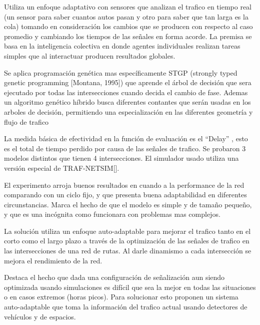 \begin{itemize}
	\begin{item}
Utiliza un enfoque adaptativo con sensores que analizan el trafico en tiempo real (un sensor para saber cuantos autos pasan y otro para saber que tan larga es la cola) tomando en consideración los cambios que se producen con respecto al caso promedio y cambiando los tiempos de las señales en forma acorde.
La premisa se basa en la inteligencia colectiva en donde agentes individuales realizan tareas simples que al interactuar producen resultados globales.

Se aplica programación genética mas específicamente STGP (strongly typed genetic programming [Montana, 1995]) que aprende el árbol de decisión que sera ejecutado por todas las intersecciones cuando decida el cambio de fase. Ademas un algoritmo genético híbrido busca diferentes contantes que serán usadas en los arboles de decisión, permitiendo una especialización en las diferentes geometría y flujo de trafico

La medida básica de efectividad en la función de evaluación es el “Delay” , esto es el total de tiempo perdido por causa de las señales de trafico. Se probaron 3 modelos distintos que tienen 4 intersecciones.
El simulador usado utiliza una versión especial de TRAF-NETSIM[].

El experimento arroja buenos resultados en cuando a la performance de la red comparando con un ciclo fijo, y que presenta buena adaptabilidad en diferentes circunstancias. Marca el hecho de que el modelo es simple y de tamaño pequeño, y que es una incógnita como funcionara con problemas mas complejos.
	
	\end{item}	


	\begin{item}
		\bibentry{Vogel2000}

La solución utiliza un enfoque auto-adaptable para mejorar el trafico tanto en el corto como el largo plazo a través de la optimización de las señales de trafico en las intersecciones de una red de rutas. Al darle dinamismo a cada intersección se mejora el rendimiento de la red.

Destaca el hecho que dada una configuración de señalización aun siendo optimizada usando simulaciones es difícil que sea la mejor en todas las situaciones o en casos extremos (horas picos). Para solucionar esto proponen un sistema auto-adaptable que toma la información del trafico actual usando detectores de vehículos y de espacios.


\end{item}
\end{itemize}
